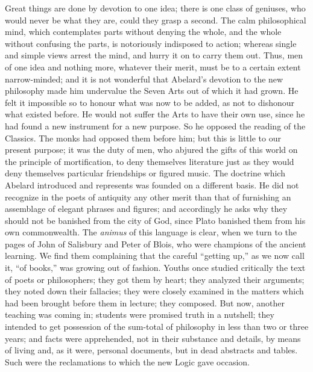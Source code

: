 Great things are done by
devotion to one idea; there is one class of geniuses, who would never
be what they are, could they grasp a second. The calm philosophical
mind, which contemplates parts without denying the whole, and the
whole without confusing the parts, is notoriously indisposed to
action; whereas single and simple views arrest the mind, and hurry it
on to carry them out. Thus, men of one idea and nothing more, whatever
their merit, must be to a certain extent narrow-minded; and it is not
wonderful that Abelard's devotion to the new philosophy made him
undervalue the Seven Arts out of which it had grown. He felt it
impossible so to honour what was now to be added, as not to dishonour
what existed before. He would not suffer the Arts to have their own
use, since he had found a new instrument for a new purpose. So he
opposed the reading of the Classics. The monks had opposed them before
him; but this is little to our present purpose; it was the duty of
men, who abjured the gifts of this world on the principle of
mortification, to deny themselves literature just as they would deny
themselves particular friendships or figured music. The doctrine which
Abelard introduced and represents was founded on a different basis. He
did not recognize in the poets of antiquity any other merit than that
of furnishing an assemblage of elegant phrases and figures; and
accordingly he asks why they should not be banished from the city of
God, since Plato banished them from his own commonwealth. The \emph{animus}
of this language is clear, when we turn to the pages of John of
Salisbury and Peter of Blois, who were champions of the ancient
learning. We find them complaining that the careful ``getting up,''
as we now call it, ``of books,'' was growing out of fashion. Youths
once studied critically the text of poets or philosophers; they got
them by heart; they analyzed their arguments; they noted down their
fallacies; they were closely examined in the matters which had been
brought before them in lecture; they composed. But now, another
teaching was coming in; students were promised truth in a nutshell;
they intended to get possession of the sum-total of philosophy in less
than two or three years; and facts were apprehended, not in their
substance and details, by means of living and, as it were, personal
documents, but in dead abstracts and tables. Such were the
reclamations to which the new Logic gave occasion.

